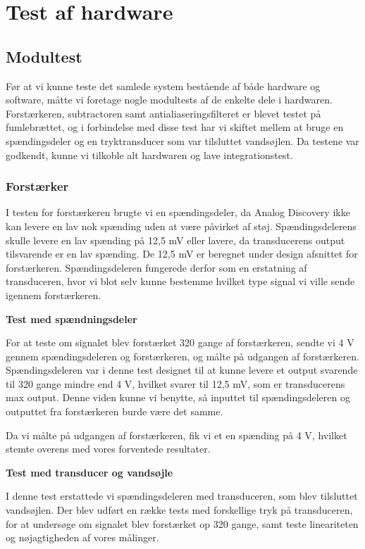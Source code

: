 \section{Test af hardware}
\subsection{Modultest}
Før at vi kunne teste det samlede system bestående af både hardware og software, måtte vi foretage nogle modultests af de enkelte dele i hardwaren. Forstærkeren, subtractoren samt antialiaseringsfilteret er blevet testet på fumlebrættet, og i forbindelse med disse test har vi skiftet mellem at bruge en spændingsdeler og en tryktransducer som var tilsluttet vandsøjlen. Da testene var godkendt, kunne vi tilkoble alt hardwaren og lave integrationstest.


\subsubsection{Forstærker}
I testen for forstærkeren brugte vi en spændingsdeler, da Analog Discovery ikke kan levere en lav nok spænding uden at være påvirket af støj. Spændingsdelerens skulle levere en lav spænding på 12,5 mV eller lavere, da transducerens output tilsvarende er en lav spænding. De 12,5 mV er beregnet under design afsnittet for forstærkeren. Spændingsdeleren fungerede derfor som en erstatning af transduceren, hvor vi blot selv kunne bestemme hvilket type signal vi ville sende igennem forstærkeren.

\textbf{Test med spændningsdeler}

For at teste om signalet blev forstærket 320 gange af forstærkeren, sendte vi 4 V gennem spændingsdeleren og forstærkeren, og målte på udgangen af forstærkeren. Spændingsdeleren var i denne test designet til at kunne levere et output svarende til 320 gange mindre end 4 V, hvilket svarer til 12,5 mV, som er transducerens max output. Denne viden kunne vi benytte, så inputtet til spændingsdeleren og outputtet fra forstærkeren burde være det samme.

Da vi målte på udgangen af forstærkeren, fik vi et en spænding på 4 V, hvilket stemte overens med vores forventede resultater.


\textbf{Test med transducer og vandsøjle}

I denne test erstattede vi spændingsdeleren med transduceren, som blev tilsluttet vandsøjlen. Der blev udført en række tests med forskellige tryk på transduceren, for at undersøge om signalet blev forstærket op 320 gange, samt teste lineariteten og nøjagtigheden af vores målinger.

